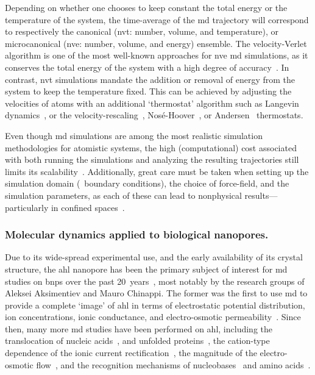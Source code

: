Depending on whether one chooses to keep constant the total energy or the temperature of the system, the
time-average of the \gls{md} trajectory will correspond to respectively the canonical (\gls{nvt}: number,
volume, and temperature), or microcanonical (\gls{nve}: number, volume, and energy) ensemble. The
velocity-Verlet algorithm is one of the most well-known approaches for \gls{nve} \gls{md} simulations, as it
conserves the total energy of the system with a high degree of accuracy~\cite{Swope-1982}. In contrast,
\gls{nvt} simulations mandate the addition or removal of energy from the system to keep the temperature fixed.
This can be achieved by adjusting the velocities of atoms with an additional `thermostat' algorithm such as
Langevin dynamics~\cite{Bussi-2008}, or the velocity-rescaling~\cite{Heyes-1983},
Nos\'{e}-Hoover~\cite{Nose-1984,Hoover-1985}, or Andersen~\cite{Andersen-1980} thermostats.

Even though \gls{md} simulations are among the most realistic simulation methodologies for atomistic
systems, the high (computational) cost associated with both running the simulations and analyzing the
resulting trajectories still limits its scalability~\cite{Vendruscolo-2011,Phillips-2020}. Additionally, great
care must be taken when setting up the simulation domain (\ie~boundary conditions), the choice of force-field,
and the simulation parameters, as each of these can lead to nonphysical results---particularly in confined
spaces~\cite{Wong-ekkabut-2016a}.


\subsubsection{Molecular dynamics applied to biological nanopores.}
%

Due to its wide-spread experimental use, and the early availability of its crystal structure, the \gls{ahl}
nanopore has been the primary subject of interest for \gls{md} studies on \glspl{bnp} over the past
20~years~\cite{Aksimentiev-2005,DeBiase-2016,Basdevant-2019}, most notably by the research groups of Aleksei
Aksimentiev and Mauro Chinappi. The former was the first to use \gls{md} to provide a complete `image' of
\gls{ahl} in terms of electrostatic potential distribution, ion concentrations, ionic conductance, and
electro-osmotic permeability~\cite{Aksimentiev-2005}. Since then, many more \gls{md} studies have been
performed on \gls{ahl}, including the translocation of nucleic acids~\cite{Wells-2007}, and unfolded
proteins~\cite{DiMarino-2015}, the cation-type dependence of the ionic current
rectification~\cite{Bhattacharya-2011}, the magnitude of the electro-osmotic flow~\cite{Bonome-2017}, and the
recognition mechanisms of nucleobases~\cite{Manara-2015b,DeBiase-2016} and amino acids~\cite{DiMuccio-2019}.

